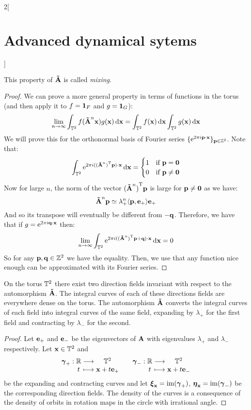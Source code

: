 \documentclass[../../../main_math.tex]{subfiles}
\begin{document}
\begin{multicols}{2}[\section{Advanced dynamical sytems}]
\begin{theorem}
$$    $$
    This property of $\boldsymbol{\mathrm{\tilde{A}}}$ is called \emph{mixing}.
  \end{theorem}
  \begin{proof}
    We can prove a more general property in terms of functions in the torus (and then apply it to $f=\boldsymbol{\mathrm{1}}_{F}$ and $g=\boldsymbol{\mathrm{1}}_{G}$):
    $$
      \lim_{n\to\infty}\int_{\mathbb{T}^2} f(\boldsymbol{\mathrm{\tilde{A}}}^n \boldsymbol{\mathrm{x}}) g(\boldsymbol{\mathrm{x}})\dd{\boldsymbol{\mathrm{x}}}=\int_{\mathbb{T}^2} f(\boldsymbol{\mathrm{x}})\dd{\boldsymbol{\mathrm{x}}}\int_{\mathbb{T}^2} g(\boldsymbol{\mathrm{x}})\dd{\boldsymbol{\mathrm{x}}}
    $$
    We will prove this for the orthonormal basis of Fourier series $\{\mathrm{e}^{2\pi i \boldsymbol{\mathrm{p}}\cdot \boldsymbol{\mathrm{x}}}\}_{\boldsymbol{\mathrm{p}}\in\mathbb{Z}^2}$. Note that:
    $$
      \int_{\mathbb{T}^2} \mathrm{e}^{2\pi i ({(\boldsymbol{\mathrm{\tilde{A}}}^n)}^{\mathrm{T}}\boldsymbol{\mathrm{p}})\cdot \boldsymbol{\mathrm{x}}}\dd{\boldsymbol{\mathrm{x}}}=\begin{cases}
        1 & \text{if }\boldsymbol{\mathrm{p}}=\boldsymbol{\mathrm{0}}    \\
        0 & \text{if }\boldsymbol{\mathrm{p}}\ne \boldsymbol{\mathrm{0}}
      \end{cases}
    $$
    Now for large $n$, the norm of the vector ${(\boldsymbol{\mathrm{\tilde{A}}}^n)}^{\mathrm{T}}\boldsymbol{\mathrm{p}}$ is large for $\boldsymbol{\mathrm{p}}\ne \boldsymbol{\mathrm{0}}$ as we have:
    $$
      \boldsymbol{\mathrm{\tilde{A}}}^n\boldsymbol{\mathrm{p}} \simeq \lambda_+^n \langle \boldsymbol{\mathrm{p}}, \boldsymbol{\mathrm{e}}_+\rangle \boldsymbol{\mathrm{e}}_+
    $$
    And so its transpose will eventually be different from $-\boldsymbol{\mathrm{q}}$. Therefore, we have that if $g=\mathrm{e}^{2\pi i \boldsymbol{\mathrm{q}} \cdot \boldsymbol{\mathrm{x}}}$ then:
    $$
      \lim_{n\to\infty}\int_{\mathbb{T}^2} \mathrm{e}^{2\pi i({(\boldsymbol{\mathrm{\tilde{A}}}^n)}^{\mathrm{T}}\boldsymbol{\mathrm{p}}+\boldsymbol{\mathrm{q}})\cdot \boldsymbol{\mathrm{x}}}\dd{\boldsymbol{\mathrm{x}}}=0
    $$
    So for any $\boldsymbol{\mathrm{p}}, \boldsymbol{\mathrm{q}}\in\mathbb{Z}^2$ we have the equality. Then, we use that any function nice enough can be approximated with its Fourier series.
  \end{proof}
  \begin{theorem}
    On the torus $\mathbb{T}^2$ there exist two direction fields invariant with respect to the automorphism $\boldsymbol{\mathrm{\tilde{A}}}$. The integral curves of each of these directions fields are everywhere dense on the torus. The automorphism $\boldsymbol{\mathrm{\tilde{A}}}$ converts the integral curves of each field into integral curves of the same field, expanding by $\lambda_+$ for the first field and contracting by $\lambda_-$ for the second.
  \end{theorem}
  \begin{proof}
    Let $\boldsymbol{\mathrm{e}}_+$ and $\boldsymbol{\mathrm{e}}_-$ be the eigenvectors of $\boldsymbol{\mathrm{A}}$ with eigenvalues $\lambda_+$ and $\lambda_-$ respectively. Let $\boldsymbol{\mathrm{x}}\in \mathbb{T}^2$ and
    $$
      \function{\vf\gamma_+}{\RR}{\TT^2}{t}{\vf{x}+t \vf{e}_+}\quad
      \function{\vf\gamma_-}{\RR}{\TT^2}{t}{\vf{x}+t \vf{e}_-}
    $$
    be the expanding and contracting curves and let $\boldsymbol{\mathrm{\xi}}_{\boldsymbol{\mathrm{x}}}=\operatorname{im}(\boldsymbol{\mathrm{\gamma}}_+)$, $\boldsymbol{\mathrm{\eta}}_{\boldsymbol{\mathrm{x}}}=\operatorname{im}(\boldsymbol{\mathrm{\gamma}}_-)$ be the corresponding direction fields. The density of the curves is a consequence of the density of orbits in rotation maps in the circle with irrational angle.

\end{proof}
\end{multicols}
\end{document}
